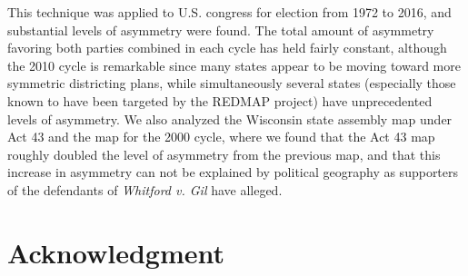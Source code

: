 \documentclass[preprint,12pt]{article}
\begin{document}
This technique was applied to U.S. congress for election from 1972 to 2016, and substantial levels of asymmetry were found.
The total amount of asymmetry favoring both parties combined in each cycle has held fairly constant, although the 2010 cycle is remarkable since many states appear to be moving toward more symmetric districting plans, while simultaneously several states (especially those known to have been targeted by the REDMAP project) have unprecedented levels of asymmetry.
We also analyzed the Wisconsin state assembly map under Act 43 and the map for the 2000 cycle, where we found that the Act 43 map roughly doubled the level of asymmetry from the previous map, and that this increase in asymmetry can not be explained by political geography as supporters of the defendants of \emph{Whitford v. Gil} have alleged.


\clearpage
\section*{Acknowledgment}
\section*{}


\clearpage
\end{document}
